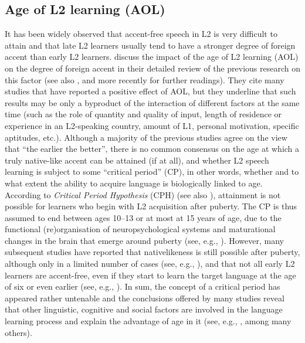 \subsection{Age of L2 learning \textup{(AOL)}}\label{sec:2.1.3}

It has been widely observed that accent-free speech in L2 is very difficult to attain and that late L2 learners usually tend to have a stronger degree of foreign accent than early L2 learners. \citet{PiskeEtAl2001} discuss the impact of the age of L2 learning (AOL) on the degree of foreign accent in their detailed review of the previous research on this factor (see also \citealt{ColantoniEtAl2015, DerwingMunro2015, Piske2017}, and more recently \citealt{FlegeBohn2021} for further readings). They cite many studies that have reported a positive effect of AOL, but they underline that such results may be only a byproduct of the interaction of different factors at the same time (such as the role of quantity and quality of input, length of residence or experience in an L2-speaking country, amount of L1, personal motivation, specific aptitudes, etc.). Although a majority of the previous studies agree on the view that “the earlier the better”, there is no common consensus on the age at which a truly native-like accent can be attained (if at all), and whether L2 speech learning is subject to some “critical period” (CP), in other words, whether and to what extent the ability to acquire language is biologically linked to age. According to  \textit{Critical Period Hypothesis} (CPH) (see also \citealt{PenfieldRoberts1959}), attainment is not possible for learners who begin with L2 acquisition after puberty. The CP is thus assumed to end between ages 10--13 or at most at 15 years of age, due to the functional (re)organisation of neuropsychological systems and maturational changes in the brain that emerge around puberty (see, e.g., \citealt{Lamendella1977}). However, many subsequent studies have reported that nativelikeness is still possible after puberty, although only in a limited number of cases (see, e.g., \citealt{Birdsong2007}), and that not all early L2 learners are accent-free, even if they start to learn the target language at the age of six or even earlier (see, e.g., \citealt{Thompson1991}). In sum, the concept of a critical period has appeared rather untenable and the conclusions offered by many studies reveal that other linguistic, cognitive and social factors are involved in the language learning process and explain the advantage of age in it (see, e.g., \citealt{BialystokHakuta1999, Birdsong1999, LoewenReinders2011, FlegeBohn2021}, among many others).


